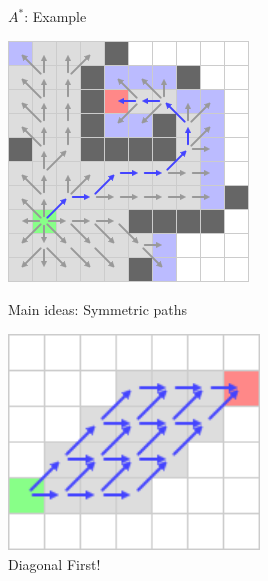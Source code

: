 \documentclass{presentation}
\begin{document}
\begin{frame}{$A^*$: Example}
\begin{minipage}{0.23\textwidth}
	\end{minipage}%
	\hfill%
	\begin{minipage}{0.23\textwidth}
		\includegraphics[width=\textwidth]{figures/A-Stern_geschnitten(241x241)/11.png}
	\end{minipage}%
\end{frame}


\begin{frame}
\end{frame}


\begin{frame}{Main ideas: Symmetric paths}
	\begin{center}
		\includegraphics[width=0.5\textwidth]{figures/symmetricpath.png}\\
		\vspace{1cm}
		Diagonal First!
	\end{center}
\end{frame}
\end{document}
